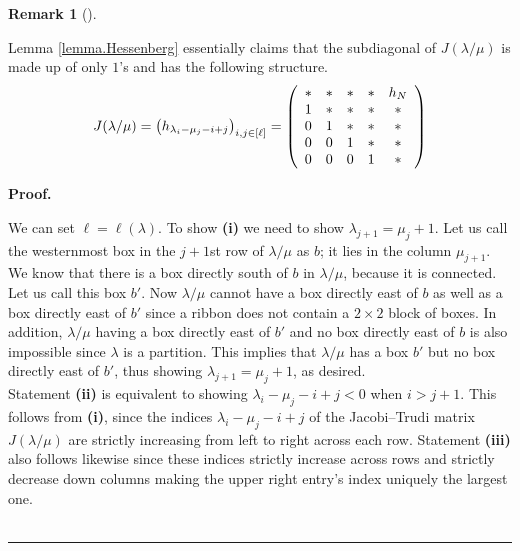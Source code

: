 \documentclass[numbers=enddot,12pt,final,onecolumn,notitlepage]{scrartcl}%
\theoremstyle{definition}
\newtheorem{remk}[theo]{Remark}
\newenvironment{remark}[1][]
{\begin{remk}[#1]\begin{leftbar}}
{\end{leftbar}\end{remk}}
\newenvironment{proof}[1][Proof]{\noindent\textbf{#1.} }{\ \rule{0.5em}{0.5em}}
\theoremstyle{plainsl}
\begin{document}
\begin{remark}
Lemma \ref{lemma.Hessenberg} essentially claims that the subdiagonal of $J(\lambda / \mu)$ is made up of only $1$'s and has the following structure. 
\[
J(\lambda / \mu) = \left(  h_{\lambda_{i}-\mu_{j}-i+j}\right)  _{i,j\in\left[  \ell\right]
}=\left(
\begin{array}
[c]{ccccc}%
\ast & \ast & \ast & \ast & h_{N}\\
1 & \ast & \ast & \ast & \ast\\
0 & 1 & \ast & \ast & \ast\\
0 & 0 & 1 & \ast & \ast\\
0 & 0 & 0 & 1 & \ast
\end{array}
\right)   
\]
\end{remark}

\begin{proof}




We can set $\ell=\ell\left(\lambda\right)$. To show \textbf{(i)} we need to show $\lambda_{j+1}=\mu_{j}+1$. Let us call the westernmost box in the $j+1$st row of $\lambda/\mu$ as $b$; it lies in the column $\mu_{j+1}$. We know that there is a box directly south of $b$ in $\lambda/\mu$, because it is connected. Let us call this box $b'$. Now $\lambda/\mu$ cannot have a box directly east of $b$ as well as a box directly east of $b'$ since a ribbon does not contain a $2\times2$ block of boxes. In addition, $\lambda/\mu$ having a box directly east of $b'$ and no box directly east of $b$ is also impossible since $\lambda$ is a partition. This implies that $\lambda/\mu$ has a box $b'$ but no box directly east of $b'$, thus showing $\lambda_{j+1}=\mu_{j}+1$, as desired.\\


Statement \textbf{(ii)} is equivalent to showing $\lambda_{i}-\mu_{j}-i+j < 0$ when $i > j+1$. This follows from \textbf{(i)}, since the indices $\lambda_{i}-\mu_{j}-i+j$ of the Jacobi--Trudi matrix $J(\lambda / \mu)$  are strictly increasing from left to right across each row. Statement \textbf{(iii)} also follows likewise since these indices strictly increase across rows and strictly decrease down columns making the upper right entry's index uniquely the largest one.\\




\end{proof}
\end{document}
